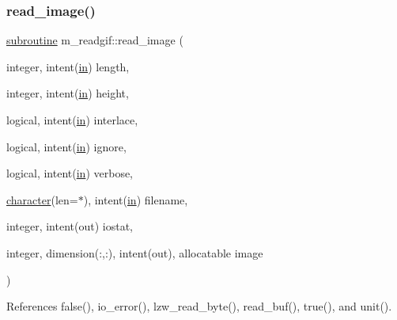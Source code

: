 \subsubsection{\texorpdfstring{read\+\_\+image()}{read\_image()}}
{\footnotesize\ttfamily \hyperlink{M__stopwatch_83_8txt_acfbcff50169d691ff02d4a123ed70482}{subroutine} m\+\_\+readgif\+::read\+\_\+image (\begin{DoxyParamCaption}\item[{integer, intent(\hyperlink{M__journal_83_8txt_afce72651d1eed785a2132bee863b2f38}{in})}]{length,  }\item[{integer, intent(\hyperlink{M__journal_83_8txt_afce72651d1eed785a2132bee863b2f38}{in})}]{height,  }\item[{logical, intent(\hyperlink{M__journal_83_8txt_afce72651d1eed785a2132bee863b2f38}{in})}]{interlace,  }\item[{logical, intent(\hyperlink{M__journal_83_8txt_afce72651d1eed785a2132bee863b2f38}{in})}]{ignore,  }\item[{logical, intent(\hyperlink{M__journal_83_8txt_afce72651d1eed785a2132bee863b2f38}{in})}]{verbose,  }\item[{\hyperlink{option__stopwatch_83_8txt_abd4b21fbbd175834027b5224bfe97e66}{character}(len=$\ast$), intent(\hyperlink{M__journal_83_8txt_afce72651d1eed785a2132bee863b2f38}{in})}]{filename,  }\item[{integer, intent(out)}]{iostat,  }\item[{integer, dimension(\+:,\+:), intent(out), allocatable}]{image }\end{DoxyParamCaption})\hspace{0.3cm}{\ttfamily [private]}}



References false(), io\+\_\+error(), lzw\+\_\+read\+\_\+byte(), read\+\_\+buf(), true(), and unit().

